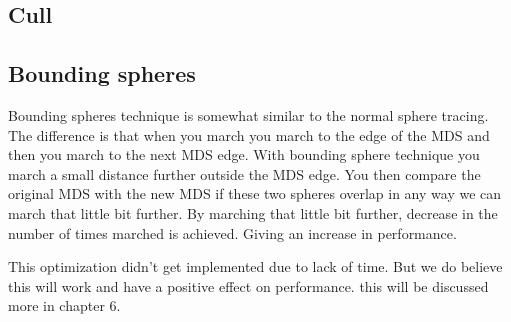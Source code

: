 		\subsection{Cull}
		
		\subsection{Bounding spheres}
	
			Bounding spheres technique is somewhat similar to the normal sphere
			tracing. The difference is that when you march you march to the
			edge of the MDS and then you march to the next MDS edge. With
			bounding sphere technique you march a small distance further
			outside the MDS edge. You then compare the original MDS with the
			new MDS if these two spheres overlap in any way we can march that
			little bit further. By marching that little bit further, decrease
			in the number of times marched is achieved. Giving an increase in
			performance. 
			
			This optimization didn't get implemented due to lack of time. But
			we do believe this will work and have a positive effect on
			performance. this will be discussed more in chapter 6.
		
